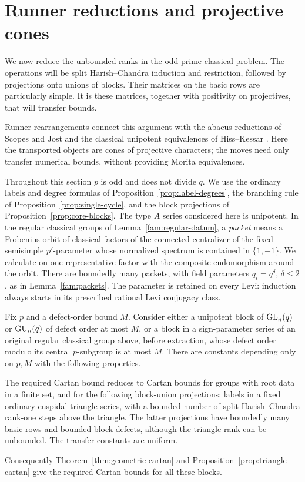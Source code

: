 \section{Runner reductions and projective cones}\label{sec:runners}

We now reduce the unbounded ranks in the odd-prime classical problem.
The operations will be split Harish--Chandra induction and restriction,
followed by projections onto unions of blocks.  Their matrices on the
basic rows are particularly simple.  It is these matrices, together
with positivity on projectives, that will transfer bounds.

Runner rearrangements connect this argument with the abacus
reductions of Scopes and Jost and the classical unipotent
equivalences of Hiss--Kessar
\cite{Scopes,Jost,HissKessarScopes,HissKessarScopesII}.
Here the transported objects are cones of projective characters;
the moves need only transfer numerical bounds, without providing
Morita equivalences.

Throughout this section \(p\) is odd and does not divide \(q\).
We use the ordinary labels and
degree formulas of Proposition~\ref{prop:label-degrees}, the branching
rule of Proposition~\ref{prop:single-cycle}, and the block projections
of Proposition~\ref{prop:core-blocks}.  The type \(A\) series considered
here is unipotent.  In the regular classical groups of
Lemma~\ref{fam:regular-datum}, a \emph{packet} means a Frobenius orbit
of classical factors of the connected centralizer of the fixed semisimple
\(p'\)-parameter whose normalized spectrum is contained in
\(\{1,-1\}\).  We calculate on one representative factor with the
composite endomorphism around the orbit.  There are boundedly many
packets, with field
parameters \(q_i=q^\delta\), \(\delta\leq2\), as in
Lemma~\ref{fam:packets}.  The parameter is retained on every Levi:
induction always starts in its prescribed rational Levi conjugacy
class.

\begin{proposition}\label{prop:runner-reduction}
Fix \(p\) and a defect-order bound \(M\).  Consider either a unipotent
block of \(\operatorname{GL}_n(q)\) or \(\operatorname{GU}_n(q)\) of defect order at most \(M\), or a
block in a sign-parameter series of an original regular classical
group above, before extraction, whose defect order modulo its
central \(p\)-subgroup is at most \(M\).
There are constants depending only on \(p,M\) with the following
properties.

The required Cartan bound reduces to Cartan bounds for groups with
root data in a finite set, and for the following block-union
projections: labels in a fixed ordinary cuspidal triangle series,
with a bounded number of split Harish--Chandra rank-one steps above
the triangle.  The latter projections have boundedly many basic
rows and bounded block defects, although the triangle rank can be
unbounded.  The transfer constants are uniform.

Consequently Theorem~\ref{thm:geometric-cartan} and
Proposition~\ref{prop:triangle-cartan} give the required Cartan bounds
for all these blocks.
\end{proposition}

